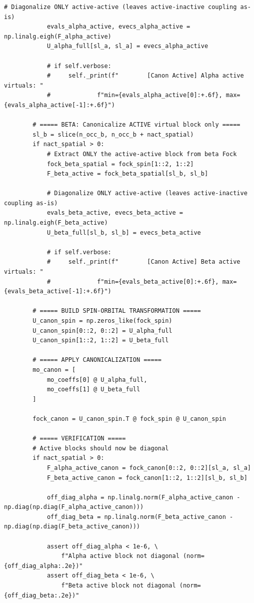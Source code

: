 \begin{lstlisting}[style=python, caption={...}, label=lst:full_code]
            # Diagonalize ONLY active-active (leaves active-inactive coupling as-is)
            evals_alpha_active, evecs_alpha_active = np.linalg.eigh(F_alpha_active)
            U_alpha_full[sl_a, sl_a] = evecs_alpha_active
            
            # if self.verbose:
            #     self._print(f"        [Canon Active] Alpha active virtuals: "
            #             f"min={evals_alpha_active[0]:+.6f}, max={evals_alpha_active[-1]:+.6f}")
        
        # ===== BETA: Canonicalize ACTIVE virtual block only =====
        sl_b = slice(n_occ_b, n_occ_b + nact_spatial)
        if nact_spatial > 0:
            # Extract ONLY the active-active block from beta Fock
            fock_beta_spatial = fock_spin[1::2, 1::2]
            F_beta_active = fock_beta_spatial[sl_b, sl_b]
            
            # Diagonalize ONLY active-active (leaves active-inactive coupling as-is)
            evals_beta_active, evecs_beta_active = np.linalg.eigh(F_beta_active)
            U_beta_full[sl_b, sl_b] = evecs_beta_active
            
            # if self.verbose:
            #     self._print(f"        [Canon Active] Beta active virtuals: "
            #             f"min={evals_beta_active[0]:+.6f}, max={evals_beta_active[-1]:+.6f}")
        
        # ===== BUILD SPIN-ORBITAL TRANSFORMATION =====
        U_canon_spin = np.zeros_like(fock_spin)
        U_canon_spin[0::2, 0::2] = U_alpha_full
        U_canon_spin[1::2, 1::2] = U_beta_full
        
        # ===== APPLY CANONICALIZATION =====
        mo_canon = [
            mo_coeffs[0] @ U_alpha_full,
            mo_coeffs[1] @ U_beta_full
        ]
        
        fock_canon = U_canon_spin.T @ fock_spin @ U_canon_spin
        
        # ===== VERIFICATION =====
        # Active blocks should now be diagonal
        if nact_spatial > 0:
            F_alpha_active_canon = fock_canon[0::2, 0::2][sl_a, sl_a]
            F_beta_active_canon = fock_canon[1::2, 1::2][sl_b, sl_b]
            
            off_diag_alpha = np.linalg.norm(F_alpha_active_canon - np.diag(np.diag(F_alpha_active_canon)))
            off_diag_beta = np.linalg.norm(F_beta_active_canon - np.diag(np.diag(F_beta_active_canon)))
            
            assert off_diag_alpha < 1e-6, \
                f"Alpha active block not diagonal (norm={off_diag_alpha:.2e})"
            assert off_diag_beta < 1e-6, \
                f"Beta active block not diagonal (norm={off_diag_beta:.2e})"
        

\end{lstlisting}
